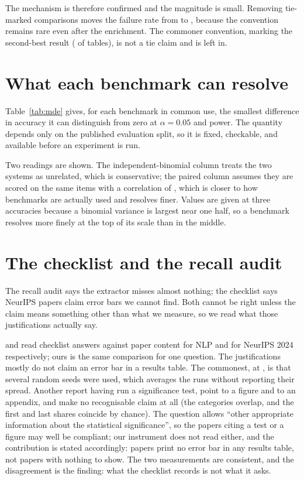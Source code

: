 \documentclass{article}
\begin{document}
The mechanism is therefore confirmed and the magnitude is small. Removing
tie-marked comparisons moves the failure rate from \nPctFail{} to
\nFailExcludingTie{}, because the convention remains rare even after the
enrichment. The commoner convention, marking the second-best result
(\nPctSecondBest{} of tables), is not a tie claim and is left in.

\section{What each benchmark can resolve}
\label{app:mde}

Table~\ref{tab:mde} gives, for each benchmark in common use, the smallest
difference in accuracy it can distinguish from zero at $\alpha = 0.05$ and
\nPowerLevel{} power. The quantity depends only on the published evaluation
split, so it is fixed, checkable, and available before an experiment is run.

Two readings are shown. The independent-binomial column treats the two systems
as unrelated, which is conservative; the paired column assumes they are scored
on the same items with a correlation of \nPairedRho{}, which is closer to how
benchmarks are actually used and resolves finer. Values are given at three
accuracies because a binomial variance is largest near one half, so a benchmark
resolves more finely at the top of its scale than in the middle.





\section{The checklist and the recall audit}
\label{app:checklist}

The recall audit says the extractor misses almost nothing; the checklist says
\nCheckYesNoTable{} NeurIPS papers claim error bars we cannot find. Both cannot
be right unless the claim means something other than what we measure, so we read
what those justifications actually say.

\citet{magnusson2023reproducibility} and \citet{goldberg2024usefulness} read
checklist answers against paper content for NLP and for NeurIPS 2024
respectively; ours is the same comparison for one question. The
justifications mostly do not claim an error bar in a results table. The commonest, at
\nJustSeeds{}, is that several random seeds were used, which averages the runs
without reporting their spread. Another \nJustTest{} report having run a significance
test, \nJustFigure{} point to a figure and \nJustAppendix{} to an appendix, and
\nJustNone{} make no recognisable claim at all (the categories overlap, and
the first and last shares coincide by chance). The question allows ``other
appropriate information about the statistical significance'', so the papers
citing a test or a figure may well be compliant; our instrument does not read
either, and the contribution is stated accordingly: \nCheckYesNoTable{} papers
print no error bar in any results table, not \nCheckYesNoTable{} papers with
nothing to show. The two measurements are consistent, and the disagreement is
the finding: what the checklist records is not what it asks.
\end{document}

